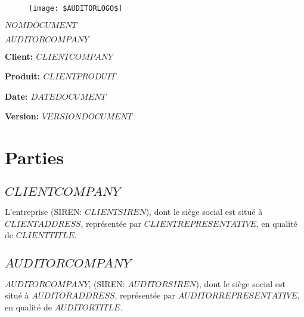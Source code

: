 \documentclass[12pt]{extarticle}
\begin{document}
    \begin{figure}[htbp]
        \centering
        \texttt{[image: \$AUDITORLOGO\$]}
    \end{figure}
    \begin{center}
        \Huge\textbf{$NOMDOCUMENT$}
    \end{center}
    \begin{center}
        \LARGE\textbf{$AUDITORCOMPANY$}
    \end{center}
    \vspace{5cm}
    \begin{flushleft}
        \normalsize\textbf{Client: $CLIENTCOMPANY$}
    \end{flushleft}
    \begin{flushleft}
        \normalsize\textbf{Produit: $CLIENTPRODUIT$}
    \end{flushleft}
    \begin{flushleft}
        \normalsize\textbf{Date: $DATEDOCUMENT$}
    \end{flushleft}
    \begin{flushleft}
        \normalsize\textbf{Version: $VERSIONDOCUMENT$}
    \end{flushleft}
    \newpage
\justify
\section{Parties}
\subsection{$CLIENTCOMPANY${}}
L'entreprise \textit{} (SIREN: \textit{$CLIENTSIREN$}), dont le siège social est situé à \textit{$CLIENTADDRESS$}, représentée par \textit{$CLIENTREPRESENTATIVE$}, en qualité de \textit{$CLIENTTITLE$}.
\subsection{$AUDITORCOMPANY$}
\textit{$AUDITORCOMPANY$}, (SIREN: \textit{$AUDITORSIREN$}), dont le siège social est situé à \textit{$AUDITORADDRESS$}, représentée par \textit{$AUDITORREPRESENTATIVE$}, en qualité de \textit{$AUDITORTITLE$}.
\end{document}
